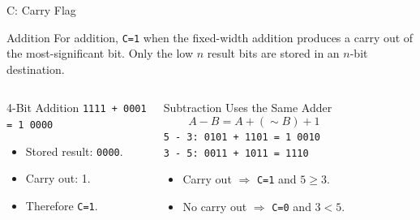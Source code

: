\documentclass[aspectratio=169,11pt,t]{beamer}
\newcommand{\code}[1]{\texttt{#1}}
\begin{document}
\begin{frame}{C: Carry Flag}
\begin{block}{Addition}
For addition, \code{C=1} when the fixed-width addition produces a carry out of the most-significant bit. Only the low $n$ result bits are stored in an $n$-bit destination.
\end{block}
\vspace{0.12cm}
\begin{columns}[T,onlytextwidth]
\begin{block}{4-Bit Addition}
\large
\hspace{1.2cm}\code{1111 + 0001}\\[0.08cm]
\hspace{1.2cm}\code{= 1 0000}
\normalsize
\begin{itemize}
\item Stored result: \code{0000}.
\item Carry out: 1.
\item Therefore \code{C=1}.
\end{itemize}
\end{block}
\begin{block}{Subtraction Uses the Same Adder}
\[
A-B=A+(\sim B)+1
\]
\small
\hspace{0.15cm}\code{5 - 3: 0101 + 1101 = 1 0010}\\[0.08cm]
\hspace{0.15cm}\code{3 - 5: 0011 + 1011 = 1110}
\normalsize
\begin{itemize}
\item Carry out $\Rightarrow$ \code{C=1} and $5\ge3$.
\item No carry out $\Rightarrow$ \code{C=0} and $3<5$.
\end{itemize}
\end{block}
\end{columns}
\end{frame}










\end{document}
